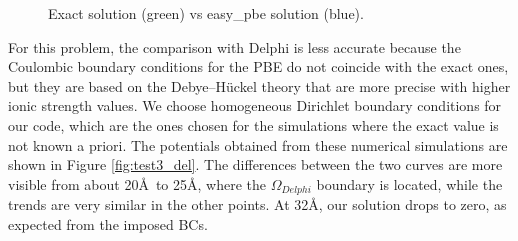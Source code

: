 \documentclass[11pt,a4paper]{article}
\begin{document}
\begin{figure}[H]
    \centering
    \quad
    \caption[]{Exact solution (green) vs easy\_pbe solution (blue).}
    \label{fig:test3_ex}
\end{figure}

For this problem, the comparison with Delphi is less accurate because the Coulombic boundary conditions for the PBE do not coincide with the exact ones, but they are based on the Debye--H\"uckel theory that are more precise with higher ionic strength values. We choose homogeneous Dirichlet boundary conditions for our code, which are the ones chosen for the simulations where the exact value is not known a priori. The potentials obtained from these numerical simulations are shown in Figure \ref{fig:test3_del}. The differences between the two curves are more visible from about 20\AA\ to 25\AA, where the  $\Omega_{Delphi}$ boundary is located, while the trends are very similar in the other points.
At 32\AA, our solution drops to zero, as expected from the imposed BCs.
\end{document}
